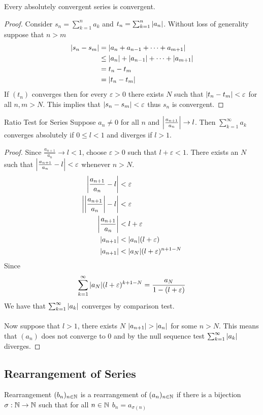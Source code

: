 \documentclass[a4paper]{article}
\begin{document}
\begin{thm}{}{} Every absolutely convergent series is convergent.\tcbline
\begin{proof} Consider $s_n=\sum_{k=1}^na_k$ and $t_n=\sum_{k=1}^n\abs{a_n}$. Without loss of generality suppose that $n>m$
\begin{align*}
\abs{s_n-s_m}&=\abs{a_n+a_{n-1}+\dots+a_{m+1}}\\
&\leq \abs{a_n}+\abs{a_{n-1}}+\dots+\abs{a_{m+1}}\\
&=t_n-t_m\\
&=\abs{t_n-t_m}
\end{align*}
If $(t_n)$ converges then for every $\varepsilon>0$ there exists $N$ such that $\abs{t_n-t_m}<\varepsilon$ for all $n,m>N$. This implies that $\abs{s_n-s_m}<\varepsilon$ thus $s_n$ is convergent. 
\end{proof}
\end{thm}

\begin{thm}{Ratio Test for Series}{} Suppose $a_n\neq0$ for all $n$ and $\abs{\frac{a_{n+1}}{a_n}}\to l$. Then $\sum_{k=1}^{\infty}a_k$ converges absolutely if $0\leq l<1$ and diverges if $l>1$. \tcbline
\begin{proof}
Since $\frac{a_{n+1}}{a_n}\to l<1$, choose $\varepsilon>0$ such that $l+\varepsilon<1$. There exists an $N$ such that $\abs{\frac{a_{n+1}}{a_n}-l}<\varepsilon$ whenever $n>N$. 
\begin{align*}
\abs{\frac{a_{n+1}}{a_n}-l}&<\varepsilon\\
\abs{\abs{\frac{a_{n+1}}{a_n}}-l}&<\varepsilon\\
\abs{\frac{a_{n+1}}{a_n}}&<l+\varepsilon\\
\abs{a_{n+1}}&<\abs{a_n}(l+\varepsilon)\\
\abs{a_{n+1}}&<\abs{a_N}(l+\varepsilon)^{n+1-N}\\
\end{align*}
Since $$\sum_{k=1}^{\infty}\abs{a_N}(l+\varepsilon)^{k+1-N}=\frac{a_N}{1-(l+\varepsilon)}$$ We have that $\sum_{k=1}^{\infty}\abs{a_k}$ converges by comparison test. \\~\\
Now suppose that $l>1$, there exists $N$ $\abs{a_{n+1}}>\abs{a_n}$ for some $n>N$. This means that $(a_n)$ does not converge to $0$ and by the null sequence test $\sum_{k=1}^{\infty}\abs{a_k}$ diverges. 
\end{proof}
\end{thm}

\subsection{Rearrangement of Series}
\begin{defn}{Rearrangement}{} $(b_n)_{n\in\mathbb{N}}$ is a rearrangement of $(a_n)_{n\in\mathbb{N}}$ if there is a bijection $\sigma:\mathbb{N}\to\mathbb{N}$ such that for all $n\in\mathbb{N}$ $b_n=a_{\sigma(n)}$
\end{defn}
\end{document}
